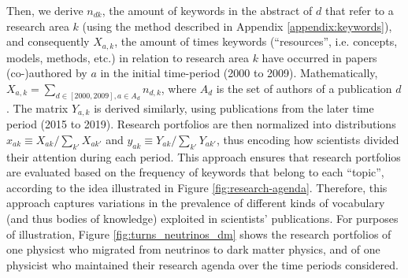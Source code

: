 \documentclass{article}
\begin{document}
Then, we derive $n_{dk}$, the amount of keywords in the abstract of $d$ that refer to a research area $k$ (using the method described in Appendix \ref{appendix:keywords}), and consequently $X_{a,k}$, the amount of times keywords (``resources'', i.e. concepts, models, methods, etc.) in relation to research area $k$ have occurred in papers (co-)authored by $a$ in the initial time-period (2000 to 2009). Mathematically, $X_{a,k}=\sum_{d\in [2000,2009],a\in A_d} n_{d,k}$, where $A_d$ is the set of authors of a publication $d$. The matrix $Y_{a,k}$ is derived similarly, using publications from the later time period (2015 to 2019). Research portfolios are then normalized into distributions $x_{ak} \equiv X_{ak}/\sum_{k'} X_{ak'}$ and $y_{ak} \equiv Y_{ak}/\sum_{k'} Y_{ak'}$, thus encoding how scientists divided their attention during each period. This approach ensures that research portfolios are evaluated based on the frequency of keywords that belong to each ``topic'', according to the idea illustrated in Figure \ref{fig:research-agenda}. Therefore, this approach captures variations in the prevalence of different kinds of vocabulary (and thus bodies of knowledge) exploited in scientists' publications. For purposes of illustration, Figure \ref{fig:turns_neutrinos_dm} shows the research portfolios of one physicst who migrated from neutrinos to dark matter physics, and of one physicist who maintained their research agenda over the time periods considered.
\end{document}
